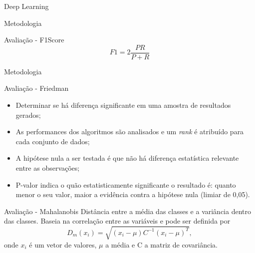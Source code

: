 \documentclass{beamer}
\begin{document}
\begin{frame}{Deep Learning}
\begin{frame}{Metodologia}
\begin{block}{Avaliação - F1Score}
\begin{equation}
  F1 = 2 \frac{PR}{P+R}
  \label{medidaf}
\end{equation}
\end{block}
\end{frame}

\begin{frame}{Metodologia}
\begin{block}{Avaliação - Friedman}
\begin{itemize}
\item Determinar se há diferença significante em uma amostra de resultados gerados;
\item As performances dos algoritmos são analisados e um \textit{rank} é atribuído para cada conjunto de dados;
\item A hipótese nula a ser testada é que não há diferença estatística relevante entre as observações;
\item P-valor indica o quão estatisticamente significante o resultado é: quanto menor o seu valor, maior a evidência contra a hipótese nula (limiar de 0,05).
\end{itemize}
\end{block}
\end{frame}
\begin{frame}{}
\begin{block}{Avaliação - Mahalanobis}  %
Distância entre a média das classes e a variância dentro das classes. Baseia na correlação entre as variáveis e pode ser definida por
\begin{equation*}
  D_m(x_i) = \sqrt{(x_i - \mu)C^{-1}(x_i-\mu)^T},
\end{equation*}
\noindent onde $x_i$ é um vetor de valores, $\mu$ a média e C a matriz de covariância.
\end{block}
\end{frame}

\end{frame}
\end{document}
